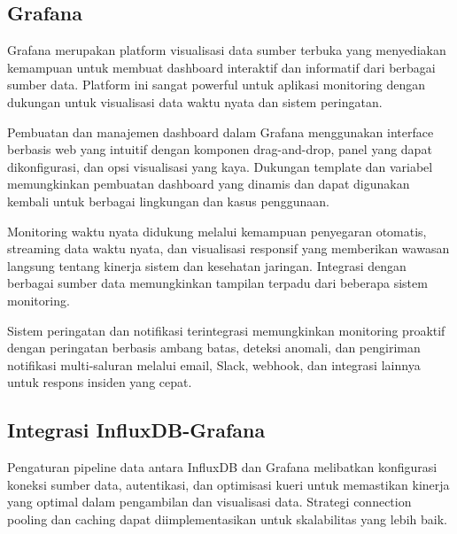 
\subsection{Grafana}

Grafana merupakan platform visualisasi data sumber terbuka yang menyediakan kemampuan untuk membuat dashboard interaktif dan informatif dari berbagai sumber data. Platform ini sangat powerful untuk aplikasi monitoring dengan dukungan untuk visualisasi data waktu nyata dan sistem peringatan.

Pembuatan dan manajemen dashboard dalam Grafana menggunakan interface berbasis web yang intuitif dengan komponen drag-and-drop, panel yang dapat dikonfigurasi, dan opsi visualisasi yang kaya. Dukungan template dan variabel memungkinkan pembuatan dashboard yang dinamis dan dapat digunakan kembali untuk berbagai lingkungan dan kasus penggunaan.

Monitoring waktu nyata didukung melalui kemampuan penyegaran otomatis, streaming data waktu nyata, dan visualisasi responsif yang memberikan wawasan langsung tentang kinerja sistem dan kesehatan jaringan. Integrasi dengan berbagai sumber data memungkinkan tampilan terpadu dari beberapa sistem monitoring.

Sistem peringatan dan notifikasi terintegrasi memungkinkan monitoring proaktif dengan peringatan berbasis ambang batas, deteksi anomali, dan pengiriman notifikasi multi-saluran melalui email, Slack, webhook, dan integrasi lainnya untuk respons insiden yang cepat.


\subsection{Integrasi InfluxDB-Grafana}

Pengaturan pipeline data antara InfluxDB dan Grafana melibatkan konfigurasi koneksi sumber data, autentikasi, dan optimisasi kueri untuk memastikan kinerja yang optimal dalam pengambilan dan visualisasi data. Strategi connection pooling dan caching dapat diimplementasikan untuk skalabilitas yang lebih baik.

